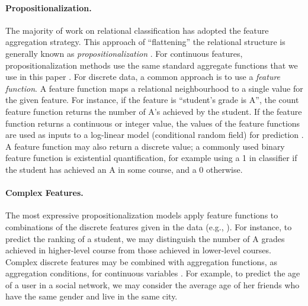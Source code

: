 \documentclass[oribibl]{llncs}%
\begin{document}
\paragraph{Propositionalization.} The majority of work on relational classification has adopted the feature aggregation strategy. 
This approach of ``flattening'' the relational structure is generally known as {\em propositionalization} \cite{Kramer2000}. %
%
For continuous features, propositionalization methods use the same standard aggregate functions that we use in this paper \cite{Krogel2002,C.Vens2004}. For discrete data, a common approach is to use a {\em feature function}. A feature function maps a relational neighbourhood to a single value for the given feature. For instance, if the feature is ``student's grade is A'', the count feature function returns the number of A's achieved by the student. If the feature function returns a continuous or integer value, the values of the feature functions are used as inputs to a log-linear model (conditional random field) for prediction \cite{Sutton2007,Taskar2002,Domingos2009,Lu2003}. A feature function may also return a discrete value; a commonly used binary feature function is existential quantification, for example using a 1 in classifier if the student has achieved an A in some course, and a 0 otherwise.

\paragraph{Complex Features.} The most expressive propositionalization models apply feature functions to combinations of the discrete features given in the data (e.g., \cite{Kuzelka2011}). For instance, to predict the ranking of a student, we may distinguish the number of A grades achieved in higher-level course from those achieved in lower-level courses. Complex discrete features may be combined with aggregation functions, as aggregation conditions, for continuous variables  \cite{C.Vens2004,Popescul2007}. For example, to predict the age of a user in a social network, we may consider the average age of her friends who have the same gender and live in the same city.
\end{document}
